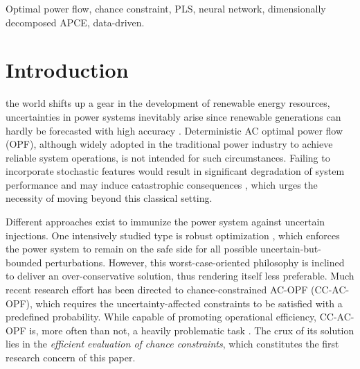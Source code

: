\documentclass[journal]{IEEEtran}
\theoremstyle{definition}
\theoremstyle{remark}
\begin{document}
\begin{IEEEkeywords}
Optimal power flow, chance constraint, PLS, neural network, dimensionally decomposed APCE, data-driven.
\end{IEEEkeywords}






%
\IEEEpeerreviewmaketitle



\section{Introduction}\label{introduction}
 the world shifts up a gear in the development of renewable energy resources, uncertainties in power systems inevitably arise since renewable generations can hardly be forecasted with high accuracy \cite{kirby2017analyzing}.
Deterministic AC optimal power flow (OPF), although widely adopted in the traditional power industry to achieve reliable system operations, is not intended for such circumstances. Failing to incorporate stochastic features would result in significant degradation of system performance and may induce catastrophic consequences \cite{wang2017efficient}, which urges the necessity of moving beyond this classical setting.  

Different approaches exist to immunize the power system against uncertain injections. One intensively studied type is robust optimization \cite{qiu2020historical}, which enforces the power system to remain on the safe side for all possible uncertain-but-bounded perturbations. However, this worst-case-oriented philosophy is inclined to deliver an over-conservative solution, thus rendering itself less preferable. Much recent research effort has been directed to chance-constrained AC-OPF (CC-AC-OPF), which requires the uncertainty-affected constraints to be satisfied with a predefined probability. While capable of promoting operational efficiency, CC-AC-OPF is, more often than not, a heavily problematic task \cite{pena2020solving}. The crux of its solution lies in the \textit{ efficient evaluation of chance constraints}, which constitutes the first research concern of this paper.
\end{document}
